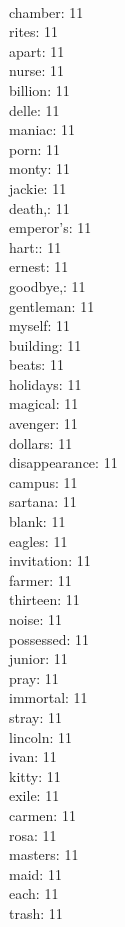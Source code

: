 \begin{multicols}{6}
  \\ chamber: 11
  \\ rites: 11
  \\ apart: 11
  \\ nurse: 11
  \\ billion: 11
  \\ delle: 11
  \\ maniac: 11
  \\ porn: 11
  \\ monty: 11
  \\ jackie: 11
  \\ death,: 11
  \\ emperor's: 11
  \\ hart:: 11
  \\ ernest: 11
  \\ goodbye,: 11
  \\ gentleman: 11
  \\ myself: 11
  \\ building: 11
  \\ beats: 11
  \\ holidays: 11
  \\ magical: 11
  \\ avenger: 11
  \\ dollars: 11
  \\ disappearance: 11
  \\ campus: 11
  \\ sartana: 11
  \\ blank: 11
  \\ eagles: 11
  \\ invitation: 11
  \\ farmer: 11
  \\ thirteen: 11
  \\ noise: 11
  \\ possessed: 11
  \\ junior: 11
  \\ pray: 11
  \\ immortal: 11
  \\ stray: 11
  \\ lincoln: 11
  \\ ivan: 11
  \\ kitty: 11
  \\ exile: 11
  \\ carmen: 11
  \\ rosa: 11
  \\ masters: 11
  \\ maid: 11
  \\ each: 11
  \\ trash: 11

\end{multicols}
